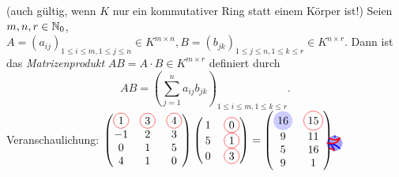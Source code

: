 \documentclass[../../main.tex]{subfiles}
\begin{document}
\begin{df}(auch gültig, wenn $K$ nur ein kommutativer Ring statt einem Körper ist!)\label{7.2.1}
Seien $m,n,r\in\mathbb N_0$, $A=(a_{ij})_{1\le i\le m,1\le j\le n}\in K^{m\times n},B=(b_{jk})_{1\le j\le n,1\le k\le r}\in K^{n\times r}$. Dann ist das \emph{Matrizenprodukt}
$AB=A\cdot B\in K^{m\times r}$ definiert durch
\[AB=\left(\sum_{j=1}^na_{ij}b_{jk}\right)_{1\le i\le m,1\le k\le r}.\]
Veranschaulichung: $\begin{pmatrix}
\tikz[baseline=(m1.base)]\node[draw=red, circle, inner sep = 2](m1){1}; & \tikz[baseline=(m2.base)]\node[draw=red, circle, inner sep = 2](m2){3}; & \tikz[baseline=(m3.base)]\node[draw=red, circle, inner sep = 2](m3){4};\\
-1 & 2 & 3\\
0 & 1 & 5\\
4 & 1 & 0
\end{pmatrix}\begin{pmatrix}
\tikz[baseline=(o1.base)]\node[inner sep = 2](o1){1}; & \tikz[baseline=(n1.base)]\node[draw=red, circle, inner sep = 2](n1){0};\\
\tikz[baseline=(o2.base)]\node[inner sep = 2](o2){5}; & \tikz[baseline=(n2.base)]\node[draw=red, circle, inner sep = 2](n2){1};\\
\tikz[baseline=(o3.base)]\node[inner sep = 2](o3){0}; & \tikz[baseline=(n3.base)]\node[draw=red, circle, inner sep = 2](n3){3};
\end{pmatrix} = \begin{pmatrix}
\tikz[baseline=(z1.base)]\node[fill=blue!20, circle, inner sep = 2](z1){16}; & \tikz[baseline=(z2.base)]\node[draw=red, circle, inner sep = 2](z2){15};\\
9 & 11\\
5 & 16\\
9 & 1
\end{pmatrix}
\begin{tikzpicture}[overlay]
\draw[opacity=.2,line width=5 mm,line cap=round,color=blue] (m1.center) to (m3.center);
\draw[opacity=.2,line width=5 mm,line cap=round,color=blue] (o1.center) to (o3.center);
\path (m1.north) edge [very thick,color=blue,bend left=40] (o1.north);
\path (m2.south) edge [very thick,color=blue,bend right=20] (o2.west);
\path (m3.south east) edge [very thick,color=blue,bend right=20] (o3.west);
\path (m1.north east) edge [very thick,color=red,bend left=40] (n1.north west);
\path (m2.north east) edge [very thick,color=red,bend left=40] (o1.west);
\path (o1.west) edge [very thick,color=red,bend right=20] (n2.west);
\path (m3.south) edge [very thick,color=red,bend right=45] (n3.south west);
\end{tikzpicture}$
\end{df}
\end{document}
